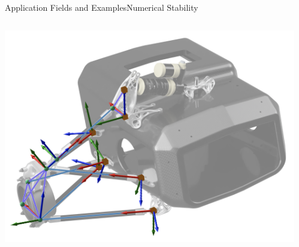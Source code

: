 \begin{frame}{Application Fields and Examples}{Numerical Stability}
  \vspace{-2.0em}\begin{columns}
    \centering
    \begin{column}[c]{0.3\textwidth}
      \includegraphics[width=\textwidth]{figures/fade_overview.png}
    \end{column}
    \begin{column}[c]{0.7\textwidth}
      \vspace{1em}\small{}
    \end{column}
  \end{columns}
\end{frame}

